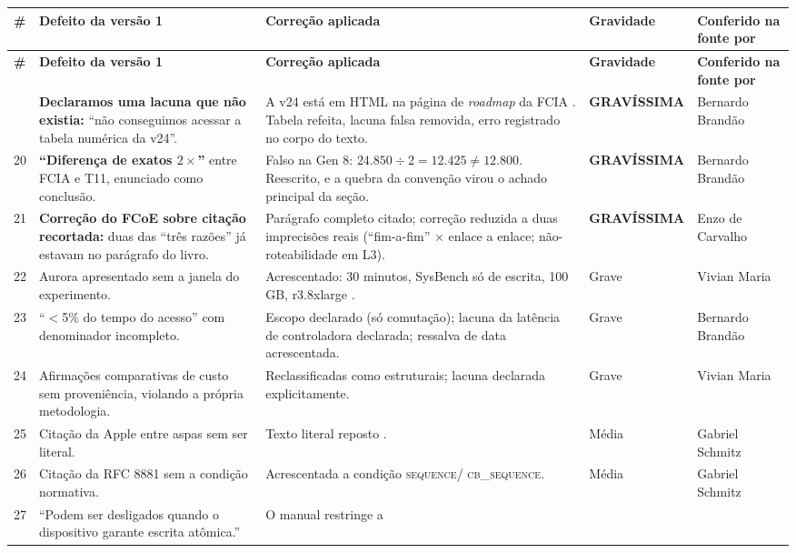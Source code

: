 \documentclass[11pt,a4paper]{article}
\begin{document}
{\scriptsize \setlength{\tabcolsep}{3pt}
\begin{longtable}{@{}p{0.35cm}p{4.6cm}p{5.5cm}p{2.0cm}p{2.0cm}@{}}
\toprule
\textbf{\#} & \textbf{Defeito da versão 1} & \textbf{Correção aplicada} & \textbf{Gravidade} &
\textbf{Conferido na fonte por} \\
\midrule
\endfirsthead
\toprule
\textbf{\#} & \textbf{Defeito da versão 1} & \textbf{Correção aplicada} & \textbf{Gravidade} &
\textbf{Conferido na fonte por} \\
\midrule
\endhead
\bottomrule
\endfoot
19 & \textbf{Declaramos uma lacuna que não existia:} ``não conseguimos acessar a tabela numérica da
v24''. & A v24 está em HTML na página de \textit{roadmap} da FCIA \cite{fciaroadmap}. Tabela
refeita, lacuna falsa removida, erro registrado no corpo do texto. & \textbf{GRAVÍSSIMA} &
Bernardo Brandão \\
20 & \textbf{``Diferença de exatos $2\times$''} entre FCIA e T11, enunciado como conclusão. & Falso
na Gen 8: $24.850 \div 2 = 12.425 \neq 12.800$. Reescrito, e a quebra da convenção virou o achado
principal da seção. & \textbf{GRAVÍSSIMA} & Bernardo Brandão \\
21 & \textbf{Correção do FCoE sobre citação recortada:} duas das ``três razões'' já estavam no
parágrafo do livro. & Parágrafo completo citado; correção reduzida a duas imprecisões reais
(``fim-a-fim'' $\times$ enlace a enlace; não-roteabilidade em L3). & \textbf{GRAVÍSSIMA} &
Enzo de Carvalho \\
22 & Aurora apresentado sem a janela do experimento. & Acrescentado: 30 minutos, SysBench só de
escrita, 100 GB, r3.8xlarge \cite{aurora2017}. & Grave & Vivian Maria \\
23 & ``$<$5\% do tempo do acesso'' com denominador incompleto. & Escopo declarado (só comutação);
lacuna da latência de controladora declarada; ressalva de data acrescentada. & Grave &
Bernardo Brandão \\
24 & Afirmações comparativas de custo sem proveniência, violando a própria metodologia. &
Reclassificadas como estruturais; lacuna declarada explicitamente. & Grave & Vivian Maria \\
25 & Citação da Apple entre aspas sem ser literal. & Texto literal reposto \cite{appleafp}. &
Média & Gabriel Schmitz \\
26 & Citação da RFC 8881 sem a condição normativa. & Acrescentada a condição \textsc{sequence}/
\textsc{cb\_sequence}. & Média & Gabriel Schmitz \\
27 & ``Podem ser desligados quando o dispositivo garante escrita atômica.'' & O manual restringe a

\end{longtable}}
\end{document}
